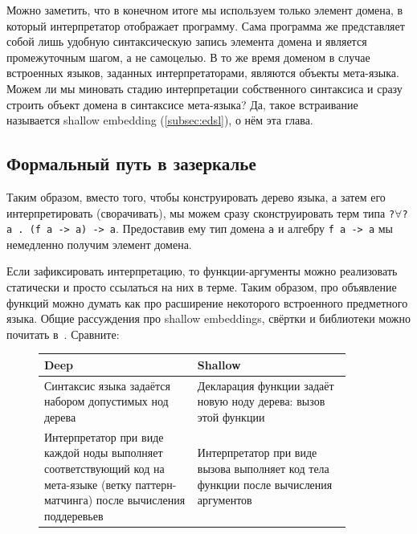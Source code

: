 Можно заметить, что в конечном итоге мы используем только элемент домена, в который интерпретатор отображает программу.
Сама программа же представляет собой лишь удобную синтаксическую запись элемента домена и является промежуточным шагом, а не самоцелью.
В то же время доменом в случае встроенных языков, заданных интерпретаторами, являются объекты мета-языка.
Можем ли мы миновать стадию интерпретации собственного синтаксиса и сразу строить объект домена в синтаксисе мета-языка?
Да, такое встраивание называется shallow embedding (\ref{subsec:edsl}), о нём эта глава.

\subsection{Формальный путь в зазеркалье} \label{subsec:to-wonderland}







Таким образом, вместо того, чтобы конструировать дерево языка, а затем его интерпретировать (сворачивать), мы можем сразу сконструировать терм типа \texttt{?$\forall$?a . (f a -> a) -> a}.
Предоставив ему тип домена \texttt{a} и алгебру \texttt{f a -> a} мы немедленно получим элемент домена.










Если зафиксировать интерпретацию, то функции-аргументы можно реализовать статически и просто ссылаться на них в терме.
Таким образом, про объявление функций можно думать как про расширение некоторого встроенного предметного языка.
Общие рассуждения про shallow embeddings, свёртки и библиотеки можно почитать в~\cite{gibbons2013functional, gibbons2014folding}.
Сравните:
\begin{figure}[h]
    \centering
    \begin{tabular}{|p{0.45\linewidth}|p{0.45\linewidth}|}
        \hline
        Deep                                                                                                                                 & Shallow                                                                              \\
        \hline
        Синтаксис языка задаётся набором допустимых нод дерева                                                                               & Декларация функции задаёт новую ноду дерева: вызов этой функции                      \\
        \hline
        Интерпретатор при виде каждой ноды выполняет соответствующий код на мета-языке (ветку паттерн-матчинга) после вычисления поддеревьев & Интерпретатор при виде вызова выполняет код тела функции после вычисления аргументов \\
        \hline
    \end{tabular}
\end{figure}

